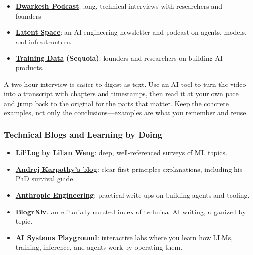 \documentclass[11pt,a4paper]{article}
\begin{document}
\begin{itemize}
    \item \textbf{\href{https://www.dwarkesh.com/}{Dwarkesh Podcast}}: long, technical interviews with researchers and founders.
    \item \textbf{\href{https://www.latent.space/}{Latent Space}}: an AI engineering newsletter and podcast on agents, models, and infrastructure.
    \item \textbf{\href{https://sequoiacap.com/trainingdata/}{Training Data} (Sequoia)}: founders and researchers on building AI products.
\end{itemize}

\begin{tcolorbox}[colback=green!5,colframe=green!50,title={Read Interviews, Don't Just Listen}]
A two-hour interview is easier to digest as text. Use an AI tool to turn the video into a transcript with chapters and timestamps, then read it at your own pace and jump back to the original for the parts that matter. Keep the concrete examples, not only the conclusions---examples are what you remember and reuse.
\end{tcolorbox}

\subsubsection{Technical Blogs and Learning by Doing}

\begin{itemize}
    \item \textbf{\href{https://lilianweng.github.io/}{Lil'Log} by Lilian Weng}: deep, well-referenced surveys of ML topics.
    \item \textbf{\href{https://karpathy.github.io/}{Andrej Karpathy's blog}}: clear first-principles explanations, including his PhD survival guide.
    \item \textbf{\href{https://www.anthropic.com/engineering}{Anthropic Engineering}}: practical write-ups on building agents and tooling.
    \item \textbf{\href{https://openenvision.org/BlogrXiv/site/index.html}{BlogrXiv}}: an editorially curated index of technical AI writing, organized by topic.
    \item \textbf{\href{https://schuture.github.io/ai-systems-playground/}{AI Systems Playground}}: interactive labs where you learn how LLMs, training, inference, and agents work by operating them.
\end{itemize}
\end{document}
